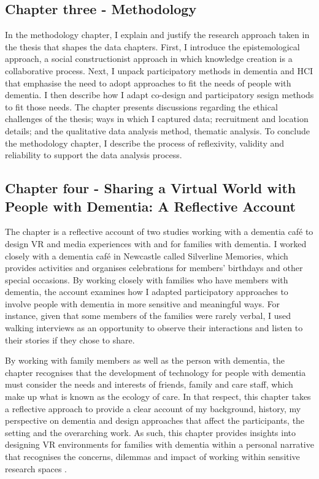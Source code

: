 \subsection{Chapter three - Methodology}
\label{Intro:ChapterThree}
In the methodology chapter, I explain and justify the research approach taken in the thesis that shapes the data chapters. First, I introduce the epistemological approach, a social constructionist approach in which knowledge creation is a collaborative process. Next, I unpack participatory methods in dementia and HCI that emphasise the need to adopt approaches to fit the needs of people with dementia. I then describe how I adapt co-design and participatory sesign methods to fit those needs. The chapter presents discussions regarding the ethical challenges of the thesis; ways in which I captured data; recruitment and location details; and the qualitative data analysis method, thematic analysis. To conclude the methodology chapter, I describe the process of reflexivity, validity and reliability to support the data analysis process. 
\subsection{Chapter four - Sharing a Virtual World with People with Dementia: A Reflective Account}
\label{Intro:ChapterFour}
The chapter is a reflective account of two studies working with a dementia café to design VR and media experiences with and for families with dementia. I worked closely with a dementia café in Newcastle called Silverline Memories, which provides activities and organises celebrations for members’ birthdays and other special occasions. By working closely with families who have members with dementia, the account examines how I adapted participatory approaches to involve people with dementia in more sensitive and meaningful ways. For instance, given that some members of the families were rarely verbal, I used walking interviews \citep{kullberg2017walking} as an opportunity to observe their interactions and listen to their stories if they chose to share. 

By working with family members as well as the person with dementia, the chapter recognises that the development of technology for people with dementia must consider the needs and interests of friends, family and care staff, which make up what is known as the ecology of care. In that respect, this chapter takes a reflective approach to provide a clear account of my background, history, my perspective on dementia and design approaches that affect the participants, the setting and the overarching work. As such, this chapter provides insights into designing VR environments for families with dementia within a personal narrative that recognises the concerns, dilemmas and impact of working within sensitive research spaces \citep{england_getting_1994}.

